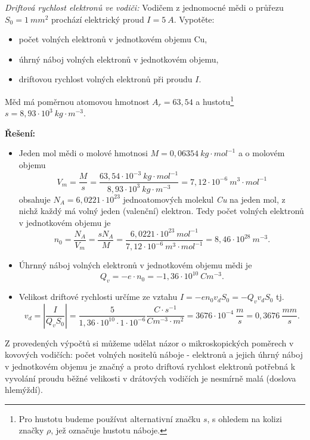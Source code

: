       \begin{example} \emph{Driftová rychlost elektronů ve vodiči:} Vodičem z jednomocné mědi o
        průřezu $S_0 = 1\ mm^2$ prochází elektrický proud $I = 5\ A$. Vypotěte:
          \begin{itemize}
            \item počet volných elektronů v jednotkovém objemu Cu,
            \item úhrný náboj volných elektronů v jednotkovém objemu,
            \item driftovou rychlost volných elektronů při proudu $I$.
          \end{itemize}
        Měd má poměrnou atomovou hmotnost $A_r = 63,54$ a hustotu\footnote{Pro hustotu budeme
        používat alternativní značku $s$, s ohledem na kolizi značky $\rho$, jež označuje hustotu
        náboje.} $s = 8,93\cdot10^3\ kg\cdot m^{-3}$.
       
       \textbf{Řešení:}\newline
         \begin{itemize}
           \item Jeden mol mědi o molové hmotnosi $M = 0,06354\ kg\cdot mol^{-1}$ a o molovém
                 objemu $$V_m = \frac{M}{s} = \frac{63,54\cdot10^{-3}\ kg\cdot
                 mol^{-1}}{8,93\cdot10^3\ kg\cdot m^{-3}} = 7,12\cdot10^{-6}\ m^3\cdot mol^{-1}$$
                 obsahuje $N_A = 6,0221\cdot10^{23}$ jednoatomových molekul \emph{Cu} na jeden mol,
                 z nichž každý má volný jeden (valenční) elektron. Tedy počet volných elektronů v
                 jednotkovém objemu je $$n_0 = \frac{N_A}{V_m} = \frac{sN_A}{M} =
                 \frac{6,0221\cdot10^{23}\ mol^{-1}}{7,12\cdot10^{-6}\ m^{3}\cdot mol^{-1}} =
                 8,46\cdot10^{28}\ m^{-3}.$$
           \item Úhrnný náboj volných elektronů v jednotkovém objemu mědi je $$Q_v = -e\cdot n_0 =
                 -1,36\cdot10^{10}\ Cm^{-3}.$$
           \item Velikost driftové rychlosti určíme ze vztahu $I = -en_0v_dS_0 = - Q_v v_d S_0$ tj.
                 $$v_d = \left|\frac{I}{Q_v S_0}\right| =
                 \frac{5}{1,36\cdot10^{10}\cdot1\cdot10^{-6}}\frac{C\cdot s^{-1}}{Cm^{-3}\cdot m^2}
                 = 3676\cdot10^{-4}\ \frac{m}{s} = 0,3676\ \frac{mm}{s}.$$
         \end{itemize}
         Z provedených výpočtů si můžeme udělat názor o mikroskopických poměrech v kovových
         vodičích: počet volných nositelů náboje - elektronů a jejich úhrný náboj v jednotkovém
         objemu je značný a proto driftová rychlost elektronů potřebná k vyvolání proudu běžné
         velikosti v drátových vodičích je nesmírně malá (doslova hlemýždí).
      \end{example}  
     
